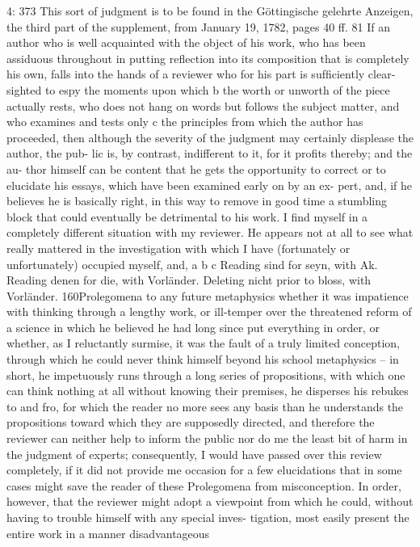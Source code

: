 4: 373
This sort of judgment is to be found in the Göttingische gelehrte Anzeigen,
the third part of the supplement, from January 19, 1782, pages 40 ff. 81
If an author who is well acquainted with the object of his work, who
has been assiduous throughout in putting reﬂection into its composition
that is completely his own, falls into the hands of a reviewer who for
his part is sufﬁciently clear-sighted to espy the moments upon which b
the worth or unworth of the piece actually rests, who does not hang on
words but follows the subject matter, and who examines and tests only c
the principles from which the author has proceeded, then although the
severity of the judgment may certainly displease the author, the pub-
lic is, by contrast, indifferent to it, for it proﬁts thereby; and the au-
thor himself can be content that he gets the opportunity to correct or
to elucidate his essays, which have been examined early on by an ex-
pert, and, if he believes he is basically right, in this way to remove in
good time a stumbling block that could eventually be detrimental to his
work.
I ﬁnd myself in a completely different situation with my reviewer.
He appears not at all to see what really mattered in the investigation
with which I have (fortunately or unfortunately) occupied myself, and,
a
b
c
Reading sind for seyn, with Ak.
Reading denen for die, with Vorländer.
Deleting nicht prior to bloss, with Vorländer.
160Prolegomena to any future metaphysics
whether it was impatience with thinking through a lengthy work, or
ill-temper over the threatened reform of a science in which he believed
he had long since put everything in order, or whether, as I reluctantly
surmise, it was the fault of a truly limited conception, through which he
could never think himself beyond his school metaphysics – in short, he
impetuously runs through a long series of propositions, with which one
can think nothing at all without knowing their premises, he disperses his
rebukes to and fro, for which the reader no more sees any basis than he
understands the propositions toward which they are supposedly directed,
and therefore the reviewer can neither help to inform the public nor do
me the least bit of harm in the judgment of experts; consequently, I would
have passed over this review completely, if it did not provide me occasion
for a few elucidations that in some cases might save the reader of these
Prolegomena from misconception.
In order, however, that the reviewer might adopt a viewpoint from
which he could, without having to trouble himself with any special inves-
tigation, most easily present the entire work in a manner disadvantageous
